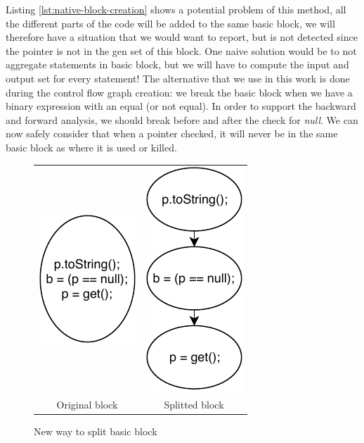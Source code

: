 Listing \ref{lst:native-block-creation} shows a potential problem of this method, all the different parts of the code will be added to the same basic block, we will therefore have a situation that we would want to report, but is not detected since the pointer is not in the gen set of this block. 
One naive solution would be to not aggregate statements in basic block, but we will have to compute the input and output set for every statement! 
\newline
The alternative that we use in this work is done during the control flow graph creation: we break the basic block when we have a binary expression with an equal (or not equal). 
In order to support the backward and forward analysis, we should break before and after the check for \emph{null}. 
We can now safely consider that when a pointer checked, it will never be in the same basic block as where it is used or killed.
\begin{figure}[h]
\caption{New way to split basic block}
\label{figure:new-way-to-split}
\setlength{\tabcolsep}{24pt}
	\begin{tabular}{cc}
		\includegraphics[]{figure/original-block-cfg.pdf}  &
		\includegraphics[]{figure/splitted-block-cfg.pdf}   \\ 
		Original block & Splitted block
	\end{tabular}
\end{figure}

